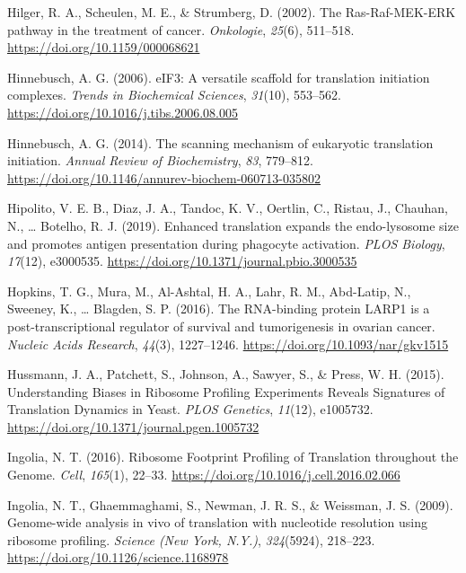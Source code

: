 \documentclass[12pt,openany]{book}
\begin{document}
\hypertarget{ref-Hilger2002}{}
Hilger, R. A., Scheulen, M. E., \& Strumberg, D. (2002). The
Ras-Raf-MEK-ERK pathway in the treatment of cancer. \emph{Onkologie},
\emph{25}(6), 511--518. \url{https://doi.org/10.1159/000068621}

\hypertarget{ref-Hinnebusch2006}{}
Hinnebusch, A. G. (2006). eIF3: A versatile scaffold for translation
initiation complexes. \emph{Trends in Biochemical Sciences},
\emph{31}(10), 553--562.
\url{https://doi.org/10.1016/j.tibs.2006.08.005}

\hypertarget{ref-Hinnebusch2014}{}
Hinnebusch, A. G. (2014). The scanning mechanism of eukaryotic
translation initiation. \emph{Annual Review of Biochemistry}, \emph{83},
779--812. \url{https://doi.org/10.1146/annurev-biochem-060713-035802}

\hypertarget{ref-Hipolito2019}{}
Hipolito, V. E. B., Diaz, J. A., Tandoc, K. V., Oertlin, C., Ristau, J.,
Chauhan, N., \ldots{} Botelho, R. J. (2019). Enhanced translation
expands the endo-lysosome size and promotes antigen presentation during
phagocyte activation. \emph{PLOS Biology}, \emph{17}(12), e3000535.
\url{https://doi.org/10.1371/journal.pbio.3000535}

\hypertarget{ref-Hopkins2016}{}
Hopkins, T. G., Mura, M., Al-Ashtal, H. A., Lahr, R. M., Abd-Latip, N.,
Sweeney, K., \ldots{} Blagden, S. P. (2016). The RNA-binding protein
LARP1 is a post-transcriptional regulator of survival and tumorigenesis
in ovarian cancer. \emph{Nucleic Acids Research}, \emph{44}(3),
1227--1246. \url{https://doi.org/10.1093/nar/gkv1515}

\hypertarget{ref-Hussmann2015}{}
Hussmann, J. A., Patchett, S., Johnson, A., Sawyer, S., \& Press, W. H.
(2015). Understanding Biases in Ribosome Profiling Experiments Reveals
Signatures of Translation Dynamics in Yeast. \emph{PLOS Genetics},
\emph{11}(12), e1005732.
\url{https://doi.org/10.1371/journal.pgen.1005732}

\hypertarget{ref-Ingolia2016}{}
Ingolia, N. T. (2016). Ribosome Footprint Profiling of Translation
throughout the Genome. \emph{Cell}, \emph{165}(1), 22--33.
\url{https://doi.org/10.1016/j.cell.2016.02.066}

\hypertarget{ref-Ingolia2009}{}
Ingolia, N. T., Ghaemmaghami, S., Newman, J. R. S., \& Weissman, J. S.
(2009). Genome-wide analysis in vivo of translation with nucleotide
resolution using ribosome profiling. \emph{Science (New York, N.Y.)},
\emph{324}(5924), 218--223.
\url{https://doi.org/10.1126/science.1168978}
\end{document}
